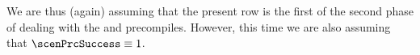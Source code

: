 \begin{center}
\end{center}
We are thus (again) assuming that the present row is the first of the second phase of dealing with the 
\instShaTwo{} and
\instRipemd{} precompiles.
However, this time we are also assuming that $\scenPrcSuccess \equiv 1$.
